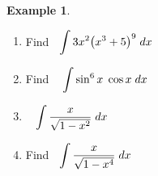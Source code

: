 \documentclass[11pt,a4paper]{article}
\theoremstyle{definition}
\newtheorem{exa}[thm]{Example}
\begin{document}
\begin{exa}
\begin{enumerate}
\item Find $\hspace{0.2cm} \displaystyle{\int 3x^2\big(x^3 + 5\big)^9\hspace{0.1cm}dx}$
\item Find $\hspace{0.3cm} \displaystyle{ \int \sin^6x\hspace{0.1cm}\cos x \hspace{0.1cm}dx}$
\item $\hspace{0.3cm} \displaystyle{\int \dfrac{x}{\sqrt{1 - x^2}}\hspace{0.1cm}dx}$
\item Find $\hspace{0.2cm} \displaystyle{\int \dfrac{x}{\sqrt{1 - x^4}}\hspace{0.1cm}dx}$
\end{enumerate}
\end{exa}
\end{document}
